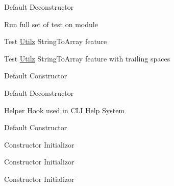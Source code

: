 \begin{DoxyRefList}
%
Default Deconstructor  
\item[Member \mbox{\hyperlink{classTestUtilz_af182698db1fad1c3cec9b4bd2e562b59}{Test\+Utilz\+::test\+\_\+all}} ()]\label{todo__todo000269}%
%
Run full set of test on module  
\item[Member \mbox{\hyperlink{classTestUtilz_ac723aa557af4212203f47a16ac48c5e6}{Test\+Utilz\+::test\+\_\+\+String\+To\+Array}} ()]\label{todo__todo000270}%
%
Test \mbox{\hyperlink{classUtilz}{Utilz}} String\+To\+Array feature  
\item[Member \mbox{\hyperlink{classTestUtilz_a34486beadd85ebf0cbeea211fdff9947}{Test\+Utilz\+::test\+\_\+\+String\+To\+Array\+\_\+\+Trailing\+Space}} ()]\label{todo__todo000271}%
%
Test \mbox{\hyperlink{classUtilz}{Utilz}} String\+To\+Array feature with trailing spaces  
\item[Member \mbox{\hyperlink{classTestUtilz_ae88165220240e13dbe3423bddb377a5f}{Test\+Utilz\+::Test\+Utilz}} ()]\label{todo__todo000268}%
%
Default Constructor  
\item[Member \mbox{\hyperlink{classTestUtilz_ae4341c09b46a168e1db3ade4a96bba33}{Test\+Utilz\+::$\sim$\+Test\+Utilz}} ()]\label{todo__todo000272}%
%
Default Deconstructor  
\item[Member \mbox{\hyperlink{classToon_a933c06ba4e92b679639df462db1e731e}{Toon\+::\+\_\+help}} ()]\label{todo__todo000107}%
%
Helper Hook used in CLI Help System  
\item[Member \mbox{\hyperlink{classToon_a451c96fb183563a81669fd953352ed67}{Toon\+::Toon}} ()]\label{todo__todo000102}%
%
Default Constructor  
\item[Member \mbox{\hyperlink{classToon_aed3a18077d6183f653916b241ffda895}{Toon\+::Toon}} (int)]\label{todo__todo000103}%
%
Constructor Initializor  
\item[Member \mbox{\hyperlink{classToon_aeab02877d7d267c2d6ca88dfa06b837f}{Toon\+::Toon}} (std\+::string)]\label{todo__todo000104}%
%
Constructor Initializor 
\item[Member \mbox{\hyperlink{classToon_a665c51a1337f1ed9981d43d8700d4278}{Toon\+::Toon}} (int, std\+::string)]\label{todo__todo000105}%
%
Constructor Initializor  
\item[Member \mbox{\hyperlink{classToon_a351a9d56ed802c8262f89e6b99c81f65}{Toon\+::Toon}} (std\+::string, int)]\label{todo__todo000106}%

\end{DoxyRefList}
